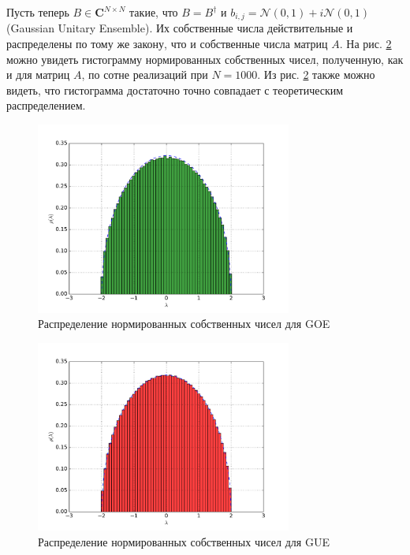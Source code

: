 \documentclass[a4paper]{article}
\begin{document}
Пусть теперь \(B\in \mathbf{C}^{N\times N}\) такие, что \(B=B^\dag\) и
\(b_{i,j} = \mathcal{N}(0,1) + i\mathcal{N}(0,1)\) (Gaussian Unitary Ensemble).
Их собственные числа действительные и распределены по тому же закону, что и собственные числа матриц \(A\).
На рис. \ref{fig:gue_eig} можно увидеть гистограмму нормированных собственных чисел,
полученную, как и для матриц \(A\), по сотне реализаций при \(N=1000\). Из рис.
\ref{fig:gue_eig} также можно видеть, что гистограмма достаточно точно совпадает с
теоретическим распределением.
\begin{figure}
	\center
	\includegraphics[width=0.75\textwidth]{../pictures/lab4_goe_eig_hist.pdf}
	\caption{Распределение нормированных собственных чисел для GOE}
	\label{fig:goe_eig}
\end{figure}
\begin{figure}
	\center
	\includegraphics[width=0.75\textwidth]{../pictures/lab4_gue_eig_hist.pdf}
	\caption{Распределение нормированных собственных чисел для GUE}
	\label{fig:gue_eig}
\end{figure}
\end{document}
